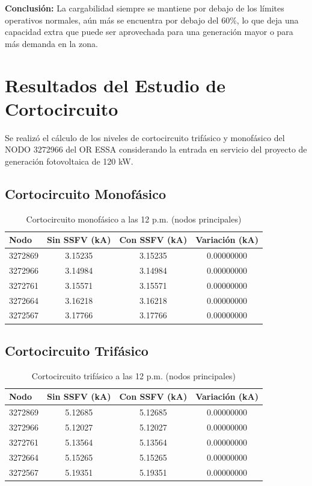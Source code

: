 \textbf{Conclusión:} La cargabilidad siempre se mantiene por debajo de los límites operativos normales, aún más se encuentra por debajo del 60\%, lo que deja una capacidad extra que puede ser aprovechada para una generación mayor o para más demanda en la zona.

\section{Resultados del Estudio de Cortocircuito}

Se realizó el cálculo de los niveles de cortocircuito trifásico y monofásico del NODO 3272966 del OR ESSA considerando la entrada en servicio del proyecto de generación fotovoltaica de 120 kW.

\subsection{Cortocircuito Monofásico}

\begin{table}[H]
    \centering
    \caption{Cortocircuito monofásico a las 12 p.m. (nodos principales)}
    \begin{tabular}{lccc}
    \toprule
    \textbf{Nodo} & \textbf{Sin SSFV (kA)} & \textbf{Con SSFV (kA)} & \textbf{Variación (kA)} \\
    \midrule
    3272869 & 3.15235 & 3.15235 & 0.00000000 \\
    3272966 & 3.14984 & 3.14984 & 0.00000000 \\
    3272761 & 3.15571 & 3.15571 & 0.00000000 \\
    3272664 & 3.16218 & 3.16218 & 0.00000000 \\
    3272567 & 3.17766 & 3.17766 & 0.00000000 \\
    \bottomrule
    \end{tabular}
\end{table}

\subsection{Cortocircuito Trifásico}

\begin{table}[H]
    \centering
    \caption{Cortocircuito trifásico a las 12 p.m. (nodos principales)}
    \begin{tabular}{lccc}
    \toprule
    \textbf{Nodo} & \textbf{Sin SSFV (kA)} & \textbf{Con SSFV (kA)} & \textbf{Variación (kA)} \\
    \midrule
    3272869 & 5.12685 & 5.12685 & 0.00000000 \\
    3272966 & 5.12027 & 5.12027 & 0.00000000 \\
    3272761 & 5.13564 & 5.13564 & 0.00000000 \\
    3272664 & 5.15265 & 5.15265 & 0.00000000 \\
    3272567 & 5.19351 & 5.19351 & 0.00000000 \\
    \bottomrule
    \end{tabular}
\end{table}

